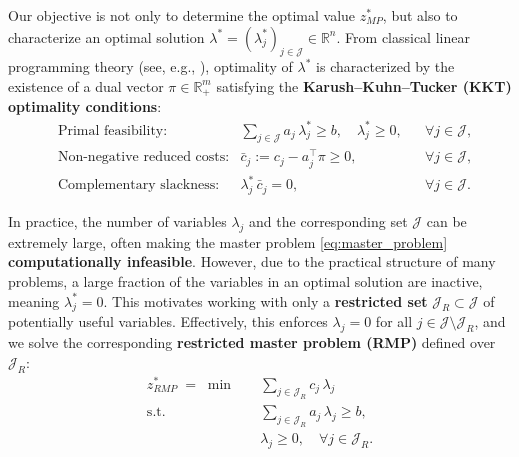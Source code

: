 \documentclass{book}
\theoremstyle{definition}
\numberwithin{algorithm_}{chapter}
\begin{document}
Our objective is not only to determine the optimal value $z_{MP}^*$, but also to characterize an optimal solution 
$\lambda^* = (\lambda_j^*)_{j \in \mathcal{J}} \in \mathbb{R}^n$. 
From classical linear programming theory (see, e.g., \cite{nocedal2006numerical}), optimality of $\lambda^*$ is characterized by the existence of a dual vector 
$\pi \in \mathbb{R}^m_+$ satisfying the \textbf{Karush--Kuhn--Tucker (KKT) optimality conditions}:
\begin{subequations}\label{eq:kkt_conditions}
\begin{align}
& \text{Primal feasibility:} & \sum_{j \in \mathcal{J}} a_j \, \lambda_j^* \ge b, \quad
\lambda_j^* \ge 0, && \forall j \in \mathcal{J}, \label{eq:kkt_primal} \\[0.5mm]
& \text{Non-negative reduced costs:} & \bar{c}_j := c_j - a_j^\top \pi \ge 0, && \forall j \in \mathcal{J}, \label{eq:kkt_reduced_costs} \\[3mm]
& \text{Complementary slackness:} & \lambda_j^* \, \bar{c}_j = 0, && \forall j \in \mathcal{J}. \label{eq:kkt_complementary}
\end{align}
\end{subequations}

In practice, the number of variables $\lambda_j$ and the corresponding set $\mathcal{J}$ can be extremely large, often making the master problem \eqref{eq:master_problem} \textbf{computationally infeasible}.  
However, due to the practical structure of many problems, a large fraction of the variables in an optimal solution are inactive, meaning $\lambda_j^* = 0$.  
This motivates working with only a \textbf{restricted set} $\mathcal{J}_R \subset \mathcal{J}$ of potentially useful variables.  
Effectively, this enforces $\lambda_j = 0$ for all $j \in \mathcal{J} \setminus \mathcal{J}_R$, and we solve the corresponding \textbf{restricted master problem (RMP)} defined over $\mathcal{J}_R$:
\begin{subequations}\label{eq:restricted_master_problem}
\begin{align}
z_{RMP}^* \;=\; \min \quad & \sum_{j \in \mathcal{J}_R} c_j \, \lambda_j \label{eq:rmp_obj} \\[1mm]
\text{s.t.} \quad 
& \sum_{j \in \mathcal{J}_R} a_j \, \lambda_j \geq b, \label{eq:rmp_constraints} \\[1mm]
& \lambda_j \ge 0, \quad \forall j \in \mathcal{J}_R. \label{eq:rmp_nonneg}
\end{align}
\end{subequations}
\end{document}
